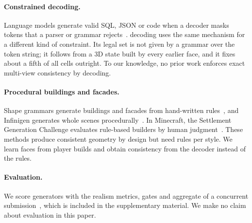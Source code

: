 \paragraph{Constrained decoding.}
Language models generate valid SQL, JSON or code when a decoder masks tokens that a parser or grammar
rejects~\citep{scholak2021picard,geng2023grammar,willard2023outlines}. \cfd{} decoding uses the same
mechanism for a different kind of constraint. Its legal set is not given by a grammar over the token
string; it follows from a 3D state built by every earlier face, and it fixes about a fifth of all
cells outright. To our knowledge, no prior work enforces exact multi-view consistency by decoding.

\paragraph{Procedural buildings and facades.}
Shape grammars generate buildings and facades from hand-written rules~\citep{muller2006procedural,muller2007facades},
and Infinigen generates whole scenes procedurally~\citep{raistrick2023infinigen}. In Minecraft, the
Settlement Generation Challenge evaluates rule-based builders by human
judgment~\citep{salge2018gdmc,salge2020gdmcreport}. These methods produce consistent geometry by design
but need rules per style. We learn faces from player builds and obtain consistency from the decoder
instead of the rules.

\paragraph{Evaluation.}
We score generators with the realism metrics, gates and \blockscore{} aggregate of a concurrent
submission~\citep{anonymous2027blindness}, which is included in the supplementary material. We make no
claim about evaluation in this paper. 
